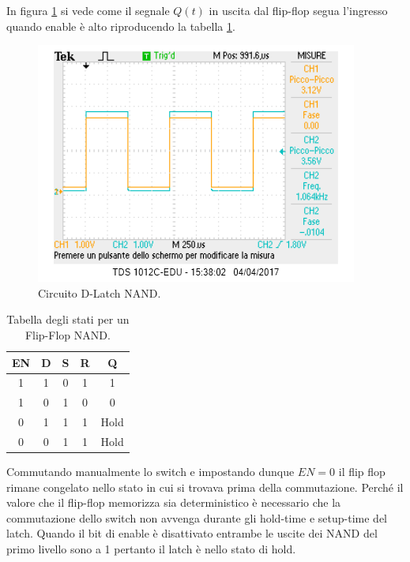 \documentclass[10pt,a4paper]{article}
\begin{document}
In figura \ref{segue} si vede come il segnale $Q(t)$ in uscita dal flip-flop segua l'ingresso quando enable è alto riproducendo la tabella \ref{stati2}.\\

\begin{figure}
\centering
\includegraphics[scale=1.0]{FFD1in2Q.png}
\caption{Circuito  D-Latch NAND.\label{segue}}
\end{figure}

\begin{table}[!htb]
\centering
\begin{tabular}{|c|c|c|c|c|}
\hline 
EN & D & S & R & Q\\ 
\hline 
1 & 1 & 0 & 1 & 1\\ 
\hline 
1 & 0 & 1 & 0 & 0\\ 
\hline 
0 & 1 & 1 & 1 & Hold\\ 
\hline 
0 & 0 & 1 & 1 & Hold\\ 
\hline 
\end{tabular}
\caption{Tabella degli stati per un Flip-Flop NAND. \label{stati2}}
\end{table}


Commutando manualmente lo switch e impostando dunque $EN = 0$ il flip flop rimane congelato nello stato in cui si trovava prima della commutazione.
Perché il valore che il flip-flop memorizza sia deterministico è necessario che la commutazione dello switch non avvenga durante gli hold-time e setup-time del latch. Quando il bit di enable è disattivato entrambe le uscite dei NAND del primo livello sono a 1 pertanto il latch è nello stato di hold.\\
\end{document}

